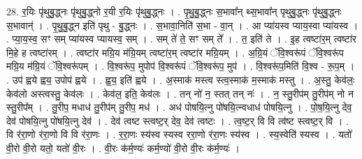 \documentclass[17pt]{extarticle}
\begin{document}
28. र॒यिः पृ॑थुबु॒द्ध्नः पृ॑थुबु॒द्ध्नो र॒यी र॒यिः पृ॑थुबु॒द्ध्नः । . पृ॒थु॒बु॒द्ध्नः स॒भावा᳚न् थ्स॒भावा᳚न् पृथुबु॒द्ध्नः पृ॑थुबु॒द्ध्नः स॒भावान्॑ । . पृ॒थु॒बु॒द्ध्न इति॑ पृथु - बु॒द्ध्नः । . स॒भावा॒निति॑ स॒भा - वा॒न् । . आ प्या॑यस्व प्याय॒स्वा प्या॑यस्व । . प्या॒य॒स्व॒ सꣳ सम् प्या॑यस्व प्यायस्व॒ सम् । . सम् ते॑ ते॒ सꣳ सम् ते᳚ । . त॒ इति॑ ते । . इ॒ह त्वष्टा॑र॒म् त्वष्टा॑र मि॒हे ह त्वष्टा॑रम् । . त्वष्टा॑र मग्रि॒य म॑ग्रि॒यम् त्वष्टा॑र॒म् त्वष्टा॑र मग्रि॒यम् । . अ॒ग्रि॒यं ॅवि॒श्वरू॑पं ॅवि॒श्वरू॑प मग्रि॒य म॑ग्रि॒यं ॅवि॒श्वरू॑पम् । . वि॒श्वरू॑प॒ मुपोप॑ वि॒श्वरू॑पं ॅवि॒श्वरू॑प॒ मुप॑ । . वि॒श्वरू॑प॒मिति॑ वि॒श्व - रू॒प॒म् । . उप॑ ह्वये ह्वय॒ उपोप॑ ह्वये । . ह्व॒य॒ इति॑ ह्वये । . अ॒स्माक॑ मस्त्व स्त्व॒स्माक॑ म॒स्माक॑ मस्तु । . अ॒स्तु॒ केव॑लः॒ केव॑लो अस्त्वस्तु॒ केव॑लः । . केव॑ल॒ इति॒ केव॑लः । . तन् नो॑ न॒ स्तत् तन् नः॑ । . न॒ स्तु॒रीप॑म् तु॒रीप॑म् नो न स्तु॒रीप᳚म् । . तु॒रीप॒ मधाध॑ तु॒रीप॑म् तु॒रीप॒ मध॑ । . अध॑ पोषयि॒त्नु पो॑षयि॒त्न्वधाध॑ पोषयि॒त्नु । . पो॒ष॒यि॒त्नु देव॒ देव॑ पोषयि॒त्नु पो॑षयि॒त्नु देव॑ । . देव॑ त्वष्ट स्त्वष्ट॒र् देव॒ देव॑ त्वष्टः । . त्व॒ष्ट॒र् वि वि त्व॑ष्ट स्त्वष्ट॒र् वि । . वि र॑रा॒णो र॑रा॒णो वि वि र॑रा॒णः । . र॒रा॒णः स्य॑स्व स्यस्व ररा॒णो र॑रा॒णः स्य॑स्व । . स्य॒स्वेति॑ स्यस्व । . यतो॑ वी॒रो वी॒रो यतो॒ यतो॑ वी॒रः । . वी॒रः क॑र्म॒ण्यः॑ कर्म॒ण्यो॑ वी॒रो वी॒रः क॑र्म॒ण्यः॑ । \newline
\end{document}
